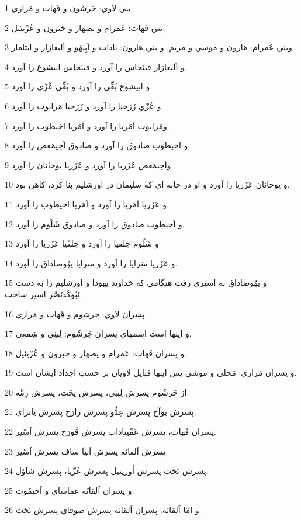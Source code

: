\par 1 بني لاوي: جَرشون و قَهات و مَراري.
\par 2 بني قَهات: عَمرام و يصهار و حَبرون و عُزّيئيل.
\par 3 وبني عَمرام: هارون و موسي و مريم. و بني هارون: ناداب و اَبِيهُو و اَليعازار و ايتامار.
\par 4 و اَليعازار فينَحاس را آورد و فينَحاس ابيشوع را آورد.
\par 5 و ابيشوع بُقِّي را آورد و بُقِّي عُزّي را آورد.
\par 6 و عُزّي زَرَحيا را آورد و زَرَحيا مَرايوت را آورد.
\par 7 ومَرايوت اَمَريا را آورد و اَمَريا اخيطوب را آورد.
\par 8 و اخيطوب صادوق را آورد و صادوق اَخِيمَعص را آورد.
\par 9 واَخِيمَعص عَزَريا را آورد و عَزَريا يوحانان را آورد.
\par 10 و يوحانان عَزَريا را آورد و او در خانه اي که سليمان در اورشليم بنا کرد، کاهن بود.
\par 11 و عَزَريا اَمَريا را آورد و اَمَريا اخيطوب را آورد.
\par 12 و اَخيطوب صادوق را آورد و صادوق شَلّوم را آورد.
\par 13 و شَلّوم حِلقيا را آورد و حِلقّيا عَزَريا را آورد
\par 14 و عَزَريا سَرايا را آورد و سرايا يهُوصاداق را آورد.
\par 15 و يهُوصاداق به اسيري رفت هنگامي که خداوند يهودا و اورشليم را به دست نَبُوکَدنَصَّر اسير ساخت.
\par 16 پسران لاوي: جرشوم و قَهات و مَراري.
\par 17 و اينها است اسمهاي پسران جَرشُوم: لِبنِي و شِمعي.
\par 18 و پسران قَهات: عَمرام و يصهار و حبرون و عُزّيئيل.
\par 19 و پسران مَراري: مَحلي و موشي پس اينها قبايل لاويان بر حسب اجداد ايشان است.
\par 20 از جَرشُوم پسرش لِبنِي، پسرش يحَت، پسرش زِمَّه.
\par 21 پسرش يوآخ پسرش عِدُّو پسرش زارَح پسرش ياتراي.
\par 22 پسران قَهات، پسرش عَمِّيناداب پسرش قُورَح پسرش اَسّير.
\par 23 پسرش اَلقانَه پسرش اَبيآ ساف پسرش اَسّير.
\par 24 پسرش تَحَت پسرش اُوريئيل پسرش عُزّيا، پسرش شاؤل.
\par 25 و پسران اَلقانَه عماساي و اَخيمُوت.
\par 26 و امّا اَلقانَه. پسران اَلقانَه پسرش صوفاي پسرش نَحَت.
